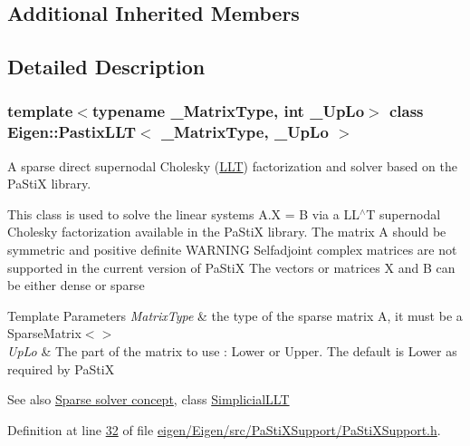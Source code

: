 \subsection*{Additional Inherited Members}


\subsection{Detailed Description}
\subsubsection*{template$<$typename \+\_\+\+Matrix\+Type, int \+\_\+\+Up\+Lo$>$\newline
class Eigen\+::\+Pastix\+L\+L\+T$<$ \+\_\+\+Matrix\+Type, \+\_\+\+Up\+Lo $>$}

A sparse direct supernodal Cholesky (\hyperlink{group___cholesky___module_class_eigen_1_1_l_l_t}{L\+LT}) factorization and solver based on the Pa\+StiX library. 

This class is used to solve the linear systems A.\+X = B via a L\+L$^\wedge$T supernodal Cholesky factorization available in the Pa\+StiX library. The matrix A should be symmetric and positive definite W\+A\+R\+N\+I\+NG Selfadjoint complex matrices are not supported in the current version of Pa\+StiX The vectors or matrices X and B can be either dense or sparse


\begin{DoxyTemplParams}{Template Parameters}
{\em Matrix\+Type} & the type of the sparse matrix A, it must be a Sparse\+Matrix$<$$>$ \\
\hline
{\em Up\+Lo} & The part of the matrix to use \+: Lower or Upper. The default is Lower as required by Pa\+StiX\\
\hline
\end{DoxyTemplParams}


\begin{DoxySeeAlso}{See also}
\hyperlink{SparseLinearSystems.dox_TutorialSparseSolverConcept}{Sparse solver concept}, class \hyperlink{group___sparse_cholesky___module_class_eigen_1_1_simplicial_l_l_t}{Simplicial\+L\+LT} 
\end{DoxySeeAlso}


Definition at line \hyperlink{eigen_2_eigen_2src_2_pa_sti_x_support_2_pa_sti_x_support_8h_source_l00032}{32} of file \hyperlink{eigen_2_eigen_2src_2_pa_sti_x_support_2_pa_sti_x_support_8h_source}{eigen/\+Eigen/src/\+Pa\+Sti\+X\+Support/\+Pa\+Sti\+X\+Support.\+h}.



